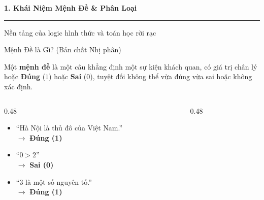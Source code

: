 \documentclass[aspectratio=169, 10pt]{beamer}
\begin{document}

\begin{frame}[plain]
  \centering
  \vspace*{2.0cm}
  {\LARGE\textbf{\color{cozySlate}1. Khái Niệm Mệnh Đề \& Phân Loại}}
  \par\vspace{0.4cm}
  {\color{cozyWarm}\rule{0.6\textwidth}{1.5pt}}
  \par\vspace{0.3cm}
  {\normalsize\color{cozyMuted}Nền tảng của logic hình thức và toán học rời rạc}
\end{frame}

\begin{frame}{Mệnh Đề là Gì? (Bản chất Nhị phân)}
  \begin{cozyDef}
    Một \textbf{mệnh đề} là một câu khẳng định một sự kiện khách quan, có giá trị chân lý hoặc \textbf{Đúng} ($1$) hoặc \textbf{Sai} ($0$), tuyệt đối không thể vừa đúng vừa sai hoặc không xác định.
  \end{cozyDef}
  \vspace{0.05cm}
  \begin{columns}[t, onlytextwidth]
    \begin{column}{0.48\textwidth}
      \begin{cozyInsight}[Ví dụ về Mệnh Đề]
        \small
        \begin{itemize}
          \setlength{\itemsep}{1pt}
          \item ``Hà Nội là thủ đô của Việt Nam.''\\
          $\to$ \textbf{\textcolor{cozyTrue}{Đúng (1)}}
          \item ``$0 > 2$''\\
          $\to$ \textbf{\textcolor{cozyFalse}{Sai (0)}}
          \item ``$3$ là một số nguyên tố.''\\
          $\to$ \textbf{\textcolor{cozyTrue}{Đúng (1)}}
        \end{itemize}
      \end{cozyInsight}
    \end{column}
    \begin{column}{0.48\textwidth}
      \begin{cozyTrap}
        \small
        \begin{itemize}
          \setlength{\itemsep}{1pt}

\end{itemize}
\end{cozyTrap}
\end{column}
\end{columns}
\end{frame}
\end{document}

